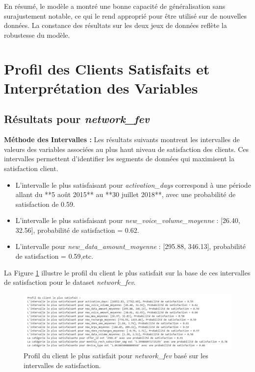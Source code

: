 En résumé, le modèle a montré une bonne capacité de généralisation sans surajustement notable, ce qui le rend approprié pour être utilisé sur de nouvelles données. La constance des résultats sur les deux jeux de données reflète la robustesse du modèle.

\section{Profil des Clients Satisfaits et Interprétation des Variables}
\subsection{Résultats pour \textit{network\_fev}}

\textbf{Méthode des Intervalles :}
Les résultats suivants montrent les intervalles de valeurs des variables associées au plus haut niveau de satisfaction des clients. Ces intervalles permettent d'identifier les segments de données qui maximisent la satisfaction client.

\begin{itemize}
    \item L'intervalle le plus satisfaisant pour \textit{activation\_days} correspond à une période allant du **5 août 2015** au **30 juillet 2018**, avec une probabilité de satisfaction de 0.59.
    \item L'intervalle le plus satisfaisant pour \textit{new\_voice\_volume\_moyenne} : [26.40, 32.56], probabilité de satisfaction = 0.62.
    \item L'intervalle pour \textit{new\_data\_amount\_moyenne} : [295.88, 346.13], probabilité de satisfaction = 0.59,etc.
\end{itemize}

La Figure \ref{fig:profil_satisfaction} illustre le profil du client le plus satisfait sur la base de ces intervalles de satisfaction pour le dataset \textit{network\_fev}.

\begin{figure}[H]
    \centering
    \includegraphics[width=0.9\linewidth]{capture_modele_32.png}
    \caption{Profil du client le plus satisfait pour \textit{network\_fev} basé sur les intervalles de satisfaction.}
    \label{fig:profil_satisfaction}
\end{figure}

